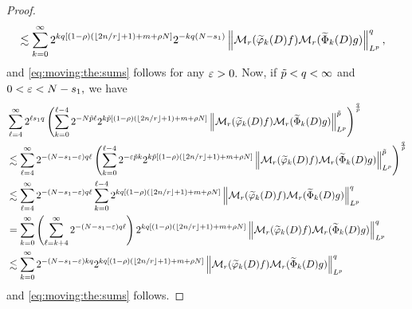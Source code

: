 \begin{proof}
\begin{align*}
& \lesssim \sum\limits_{k=0}^\infty  2^{k q [(1-\rho)( \lfloor{2n/r}\rfloor + 1) + m+\rho N]} 2^{-kq(N-s_1)}   \left\|\mathcal{M}_r(\widetilde{\varphi}_k(D)f)\mathcal{M}_r(\widetilde{\Phi}_k(D)g)\right\|_{L^p}^q,
\end{align*}
and \eqref{eq:moving:the:sums} follows for any $\varepsilon>0.$ Now, if $\tilde{p}<q <\infty$ and $0<\varepsilon < N - s_1,$ we have
\begin{align*}
& \sum\limits_{\ell=4}^\infty   2^{\ell  s_1 q} \left(  \sum\limits_{k=0}^{\ell -4} 2^{- N \tilde{p} \ell} 2^{k \tilde{p} [(1-\rho)( \lfloor{2n/r}\rfloor + 1) +m+\rho N]}   \left\|\mathcal{M}_r(\widetilde{\varphi}_k(D)f)\mathcal{M}_r(\widetilde{\Phi}_k(D)g)\right\|_{L^p}^{\tilde{p}}\right)^\frac{q}{\tilde{p}} \\
& \lesssim \sum\limits_{\ell=4}^\infty 2^{-  (N- s_1 - \varepsilon) q \ell}  \left(  \sum\limits_{k=0}^{\ell -4} 2^{-\varepsilon \tilde{p} k} 2^{k \tilde{p} [(1-\rho)( \lfloor{2n/r}\rfloor + 1) + m+\rho N]}   \left\|\mathcal{M}_r(\widetilde{\varphi}_k(D)f)\mathcal{M}_r(\widetilde{\Phi}_k(D)g)\right\|_{L^p}^{\tilde{p}}\right)^\frac{q}{\tilde{p}}\\
& \lesssim  \sum\limits_{\ell=4}^\infty 2^{-  (N- s_1 - \varepsilon) q \ell} \sum\limits_{k=0}^{\ell -4} 2^{k q [(1-\rho)( \lfloor{2n/r}\rfloor + 1) + m+\rho N]}   \left\|\mathcal{M}_r(\widetilde{\varphi}_k(D)f)\mathcal{M}_r(\widetilde{\Phi}_k(D)g)\right\|_{L^p}^q \\
& =  \sum\limits_{k=0}^\infty \left( \sum\limits_{\ell=k+4}^{\infty} 2^{- (N- s_1 - \varepsilon) q \ell} \right) 2^{k q [(1-\rho)( \lfloor{2n/r}\rfloor + 1) + m+\rho N]}   \left\|\mathcal{M}_r(\widetilde{\varphi}_k(D)f)\mathcal{M}_r(\widetilde{\Phi}_k(D)g)\right\|_{L^p}^q \\
& \lesssim \sum\limits_{k=0}^\infty  2^{- (N- s_1 - \varepsilon) kq } 2^{k q [(1-\rho)( \lfloor{2n/r}\rfloor + 1) + m+\rho N]}   \left\|\mathcal{M}_r(\widetilde{\varphi}_k(D)f)\mathcal{M}_r(\widetilde{\Phi}_k(D)g)\right\|_{L^p}^q 
\end{align*}
and \eqref{eq:moving:the:sums} follows.


\end{proof}
